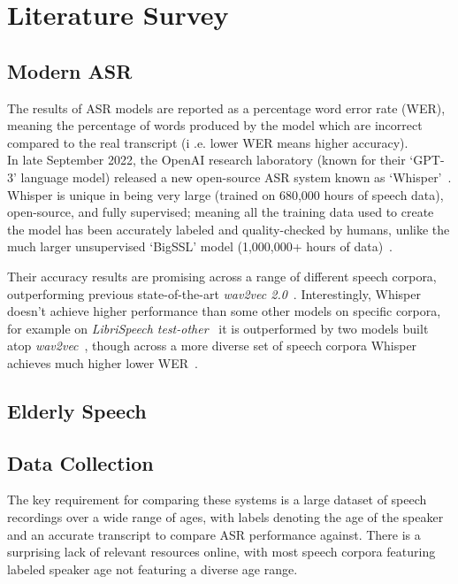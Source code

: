 \chapter{Literature Survey}\label{ch:literature-survey}

\section{Modern ASR}\label{sec:modern-asr}

The results of ASR models are reported as a percentage word error rate (WER), meaning the
percentage of words produced by the model which are incorrect compared to the real transcript (i
.e. lower WER means higher accuracy).\\

In late September 2022, the OpenAI research laboratory (known for their `GPT-3' language model)
released a new open-source ASR system known as `Whisper'~\cite{whisper}.
Whisper is unique in being very large (trained on 680,000 hours of speech data), open-source, and
fully supervised;
meaning all the training data used to create the model has been accurately labeled and
quality-checked by humans, unlike the much larger unsupervised `BigSSL' model (1,000,000+ hours
of data)~\cite{bigssl}.

Their accuracy results are promising across a range of different speech corpora, outperforming
previous state-of-the-art \emph{wav2vec 2.0}~\cite{wav2vec}.
Interestingly, Whisper doesn't achieve higher performance than some other models on specific
corpora, for example on \emph{LibriSpeech test-other}~\cite{librispeech} it is outperformed by
two models built atop \emph{wav2vec}~\cite{zhang2020,chung2021}, though across a more diverse set
of speech corpora Whisper achieves much higher lower WER~\cite{whisper}.\\

\section{Elderly Speech}\label{sec:elderly-speech}



\section{Data Collection}\label{sec:data-collection}

The key requirement for comparing these systems is a large dataset of speech recordings over a
wide range of ages, with labels denoting the age of the speaker and an accurate transcript to
compare ASR performance against.
There is a surprising lack of relevant resources online, with most speech corpora featuring
labeled speaker age not featuring a diverse age range.


